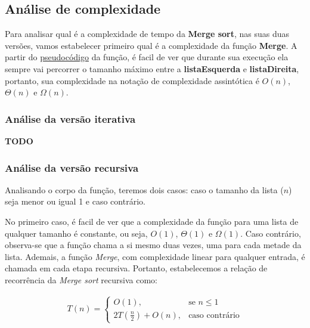 \subsection{Análise de complexidade}

Para analisar qual é a complexidade de tempo da \textbf{Merge sort}, nas suas duas versões, vamos estabelecer primeiro qual é a complexidade da função \textbf{Merge}. A partir do \href{algo:merge_aux_pseudo}{pseudocódigo} da função, é facil de ver que durante sua execução ela sempre vai percorrer o tamanho máximo entre a \textbf{listaEsquerda} e \textbf{listaDireita}, portanto, sua complexidade na notação de complexidade assintótica é $O(n)$, $\Theta(n)$ e $\Omega(n)$.

\subsubsection{Análise da versão iterativa}

\textbf{TODO}

\subsubsection{Análise da versão recursiva}

Analisando o corpo da função, teremos dois casos: caso o tamanho da lista ($n$) seja menor ou igual 1 e caso contrário.

\begin{algorithm}
	\begin{algorithmic}[0]
		 \Return
		\EndIf
		\State {}
	\end{algorithmic}
\end{algorithm}
\FloatBarrier

No primeiro caso, é facil de ver que a complexidade da função para uma lista de qualquer tamanho é constante, ou seja, $O(1)$, $\Theta(1)$ e $\Omega(1)$. Caso contrário, observa-se que a função chama a si mesmo duas vezes, uma para cada metade da lista. Ademais, a função \textit{Merge}, com complexidade linear para qualquer entrada, é chamada em cada etapa recursiva. Portanto, estabelecemos a relação de recorrência da \textit{Merge sort} recursiva como:

\begin{align*}
	\label{recc:rec_merge_sort}
	T(n) =
	\begin{cases}
		O(1),                   & \text{se $n \leq 1$}  \\
		2T(\frac{n}{2}) + O(n), & \text{caso contrário}
	\end{cases}
\end{align*}

